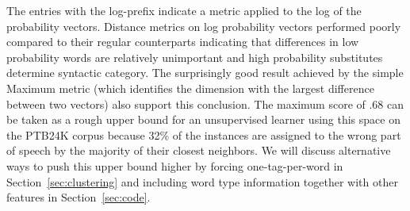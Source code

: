 The entries with the log-prefix indicate a metric applied to the log
of the probability vectors.  Distance metrics on log probability
vectors performed poorly compared to their regular counterparts
indicating that differences in low probability words are relatively
unimportant and high probability substitutes determine syntactic
category.  The surprisingly good result achieved by the simple Maximum
metric (which identifies the dimension with the largest difference
between two vectors) also support this conclusion.  The maximum score
of .68 can be taken as a rough upper bound for an unsupervised learner
using this space on the PTB24K corpus because 32\% of the instances
are assigned to the wrong part of speech by the majority of their
closest neighbors.  We will discuss alternative ways to push this
upper bound higher by forcing one-tag-per-word in
Section~\ref{sec:clustering} and including word type information
together with other features in Section~\ref{sec:code}.


